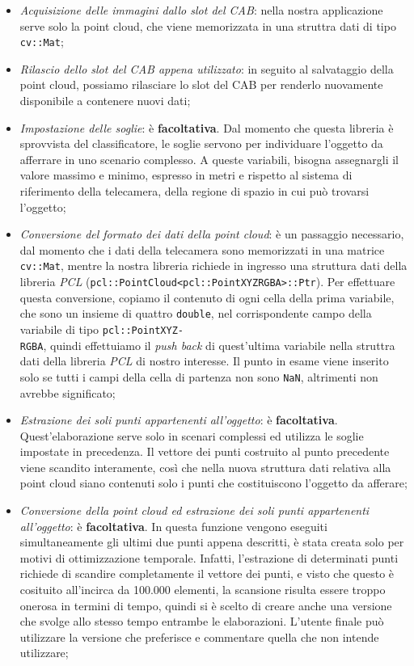 \documentclass{report}
\begin{document}
\begin{itemize}
\item \textit{Acquisizione delle immagini dallo slot del CAB}: nella nostra applicazione serve solo la point cloud, che viene memorizzata in una struttra dati di tipo \texttt{cv::Mat};
\item \textit{Rilascio dello slot del CAB appena utilizzato}: in seguito al salvataggio della point cloud, possiamo rilasciare lo slot del CAB per renderlo nuovamente disponibile a contenere nuovi dati;
\item \textit{Impostazione delle soglie}: è \textbf{facoltativa}. Dal momento che questa libreria è sprovvista del classificatore, le soglie servono per individuare l'oggetto da afferrare in uno scenario complesso. A queste variabili, bisogna assegnargli il valore massimo e minimo, espresso in metri e rispetto al sistema di riferimento della telecamera, della regione di spazio in cui può trovarsi l'oggetto;
\item \textit{Conversione del formato dei dati della point cloud}: è un passaggio necessario, dal momento che i dati della telecamera sono memorizzati in una matrice \texttt{cv::Mat}, mentre la nostra libreria richiede in ingresso una struttura dati della libreria \textit{PCL} (\texttt{pcl::PointCloud<pcl::PointXYZRGBA>::Ptr}). Per effettuare questa conversione, copiamo il contenuto di ogni cella della prima variabile, che sono un insieme di quattro \texttt{double}, nel corrispondente campo della variabile di tipo \texttt{pcl::PointXYZ-}\\\texttt{RGBA}, quindi effettuiamo il \textit{push back} di quest'ultima variabile nella struttra dati della libreria \textit{PCL} di nostro interesse. Il punto in esame viene inserito solo se tutti i campi della cella di partenza non sono \texttt{NaN}, altrimenti non avrebbe significato;
\item \textit{Estrazione dei soli punti appartenenti all'oggetto}: è \textbf{facoltativa}. Quest'elaborazione serve solo in scenari complessi ed utilizza le soglie impostate in precedenza. Il vettore dei punti costruito al punto precedente viene scandito interamente, così che nella nuova struttura dati relativa alla point cloud siano contenuti solo i punti che costituiscono l'oggetto da afferare;
\item \textit{Conversione della point cloud ed estrazione dei soli punti appartenenti all'oggetto}: è \textbf{facoltativa}. In questa funzione vengono eseguiti simultaneamente gli ultimi due punti appena descritti, è stata creata solo per motivi di ottimizzazione temporale. Infatti, l'estrazione di determinati punti richiede di scandire completamente il vettore dei punti, e visto che questo è cosituito all'incirca da 100.000 elementi, la scansione risulta essere troppo onerosa in termini di tempo, quindi si è scelto di creare anche una versione che svolge allo stesso tempo entrambe le elaborazioni. L'utente finale può utilizzare la versione che preferisce e commentare quella che non intende utilizzare;

\end{itemize}
\end{document}
